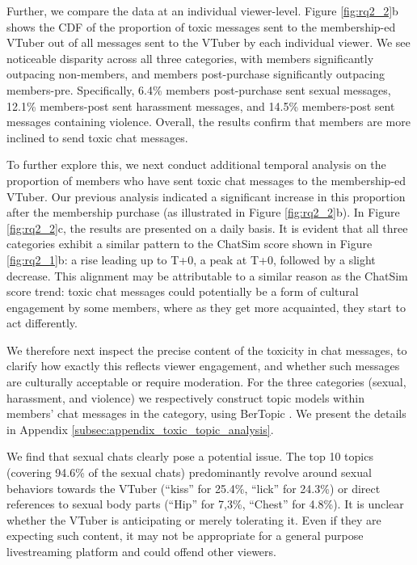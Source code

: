 Further, we compare the data at an individual viewer-level. Figure \ref{fig:rq2_2}b shows the CDF of the proportion of toxic messages sent to the membership-ed VTuber out of all messages sent to the VTuber by each individual viewer. We see noticeable disparity across all three categories, with members significantly outpacing non-members, and members post-purchase significantly outpacing members-pre. Specifically, 6.4\% members post-purchase sent sexual messages, 12.1\% members-post sent harassment messages, and 14.5\% members-post sent messages containing violence.
Overall, the results confirm that members are more inclined to send toxic chat messages.


To further explore this, we next conduct additional temporal analysis on the proportion of members who have sent toxic chat messages to the membership-ed VTuber. Our previous analysis indicated a significant increase in this proportion after the membership purchase (as illustrated in Figure \ref{fig:rq2_2}b).
% 
In Figure \ref{fig:rq2_2}c, the results are presented on a daily basis. It is evident that all three categories exhibit a similar pattern to the ChatSim score shown in Figure \ref{fig:rq2_1}b: a rise leading up to T+0, a peak at T+0, followed by a slight decrease. This alignment may be attributable to a similar reason as the ChatSim score trend: toxic chat messages could potentially be a form of cultural engagement by some members, where as they get more acquainted, they start to act differently.


We therefore next inspect the precise content of the toxicity in chat messages, to clarify \one how exactly this reflects viewer engagement, and \two whether such messages are culturally acceptable or require moderation.
For the three categories (sexual, harassment, and violence) we respectively construct topic models within members' chat messages in the category, using BerTopic \cite{grootendorst2022bertopic}. 
We present the details in Appendix \ref{subsec:appendix_toxic_topic_analysis}.

We find that sexual chats clearly pose a potential issue. The top 10 topics (covering 94.6\% of the sexual chats) predominantly revolve around sexual behaviors towards the VTuber (\eg ``kiss'' for 25.4\%, ``lick'' for 24.3\%) or direct references to sexual body parts (\eg ``Hip'' for 7,3\%, ``Chest'' for 4.8\%). 
It is unclear whether the VTuber is anticipating or merely tolerating it. Even if they are expecting such content, it may not be appropriate for a general purpose livestreaming platform and could offend other viewers. 

